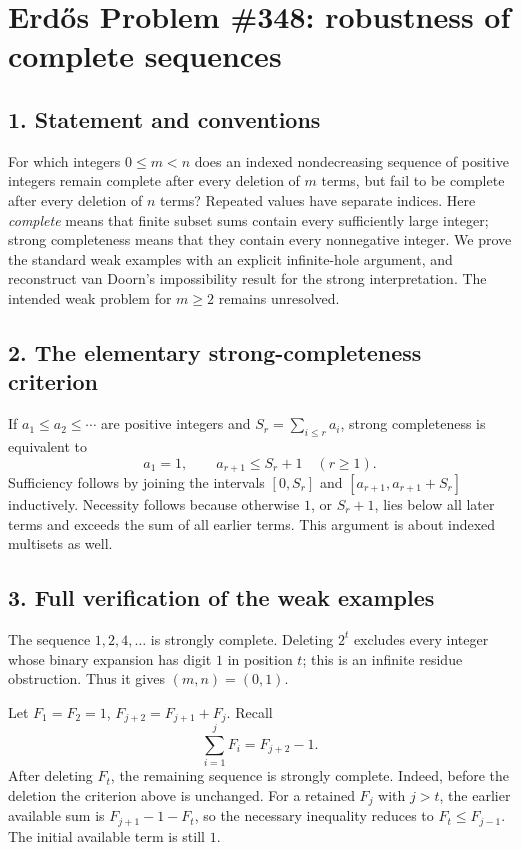 \section*{Erd\H{o}s Problem \#348: robustness of complete sequences}
\subsection*{1. Statement and conventions}
For which integers $0\le m<n$ does an indexed nondecreasing sequence
of positive integers remain complete after every deletion of $m$ terms,
but fail to be complete after every deletion of $n$ terms?
Repeated values have separate indices. Here \emph{complete} means that
finite subset sums contain every sufficiently large integer; strong
completeness means that they contain every nonnegative integer.
We prove the standard weak examples with an explicit infinite-hole
argument, and reconstruct van Doorn's impossibility result for the
strong interpretation. The intended weak problem for $m\ge2$ remains
unresolved.

\subsection*{2. The elementary strong-completeness criterion}
If $a_1\le a_2\le\cdots$ are positive integers and
$S_r=\sum_{i\le r}a_i$, strong completeness is equivalent to
\[
 a_1=1,\qquad a_{r+1}\le S_r+1\quad(r\ge1).
\]
Sufficiency follows by joining the intervals $[0,S_r]$ and
$[a_{r+1},a_{r+1}+S_r]$ inductively. Necessity follows because otherwise
$1$, or $S_r+1$, lies below all later terms and exceeds the sum of all
earlier terms. This argument is about indexed multisets as well.

\subsection*{3. Full verification of the weak examples}
The sequence $1,2,4,\ldots$ is strongly complete. Deleting $2^t$
excludes every integer whose binary expansion has digit $1$ in position
$t$; this is an infinite residue obstruction. Thus it gives $(m,n)=(0,1)$.

Let $F_1=F_2=1$, $F_{j+2}=F_{j+1}+F_j$. Recall
\[
 \sum_{i=1}^j F_i=F_{j+2}-1.
\]
After deleting $F_t$, the remaining sequence is strongly complete.
Indeed, before the deletion the criterion above is unchanged.
For a retained $F_j$ with $j>t$, the earlier available sum is
$F_{j+1}-1-F_t$, so the necessary inequality reduces to
$F_t\le F_{j-1}$. The initial available term is still $1$.

